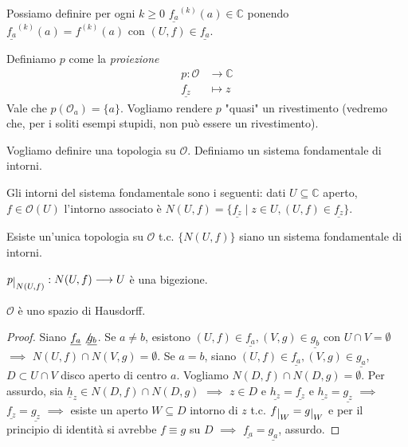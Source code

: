 \begin{oss}
  Possiamo definire per ogni $k \ge 0$ $\underline{f_a}^{(k)}(a) \in \mathbb{C}$ ponendo $\underline{f_a}^{(k)}(a)=f^{(k)}(a)$ con $(U, f) \in \underline{f_a}$.
\end{oss}

\begin{defn}
  Definiamo $p$ come la \textit{proiezione}
  \begin{align*}
    p: \mathcal{O} &\longrightarrow \mathbb{C}\\
    \underline{f_z} &\longmapsto z
  \end{align*}
  Vale che $p(\mathcal{O}_a)=\{a\}$. Vogliamo rendere $p$ "quasi" un rivestimento (vedremo che, per i soliti esempi stupidi, non può essere un rivestimento).
\end{defn}

Vogliamo definire una topologia su $\mathcal{O}$. Definiamo un sistema fondamentale di intorni.

\begin{defn}
  Gli intorni del sistema fondamentale sono i seguenti: dati $U \subseteq \mathbb{C}$ aperto, $f \in \mathcal{O}(U)$ l'intorno associato è $N(U, f)=\{\underline{f_z} \mid z \in U, (U, f) \in \underline{f_z}\}$.
\end{defn}

\begin{exc}
  Esiste un'unica topologia su $\mathcal{O}$ t.c. $\{N(U, f)\}$ siano un sistema fondamentale di intorni.
\end{exc}

\begin{oss}
  $p\restrict{N(U, f)}:N(U, f) \longrightarrow U$ è una bigezione.
\end{oss}

\begin{prop}
  $\mathcal{O}$ è uno spazio di Hausdorff.
\end{prop}

\begin{proof}
  Siano $\underline{f_a} \not \underline{g_b}$. Se $a \not= b$, esistono $(U, f) \in \underline{f_a}, (V, g) \in \underline{g_b}$ con $U \cap V=\emptyset$ $\implies$ $N(U, f) \cap N(V, g)=\emptyset$.
  Se $a=b$, siano $(U, f) \in \underline{f_a}, (V, g) \in \underline{g_a}$, $D \subset U \cap V$ disco aperto di centro $a$. Vogliamo $N(D, f) \cap N(D, g)=\emptyset$.
  Per assurdo, sia $\underline{h}_z \in N(D, f) \cap N(D, g)$ $\implies$ $z \in D$ e $\underline{h_z}=\underline{f_z}$ e $\underline{h_z}=\underline{g_z}$ $\implies$ $\underline{f_z}=\underline{g_z}$ $\implies$ esiste un aperto $W \subseteq D$ intorno di $z$ t.c. $f\restrict{W}=g\restrict{W}$ e per il principio di identità si avrebbe $f \equiv g$ su $D$ $\implies$ $\underline{f_a}=\underline{g_a}$, assurdo.
\end{proof}


